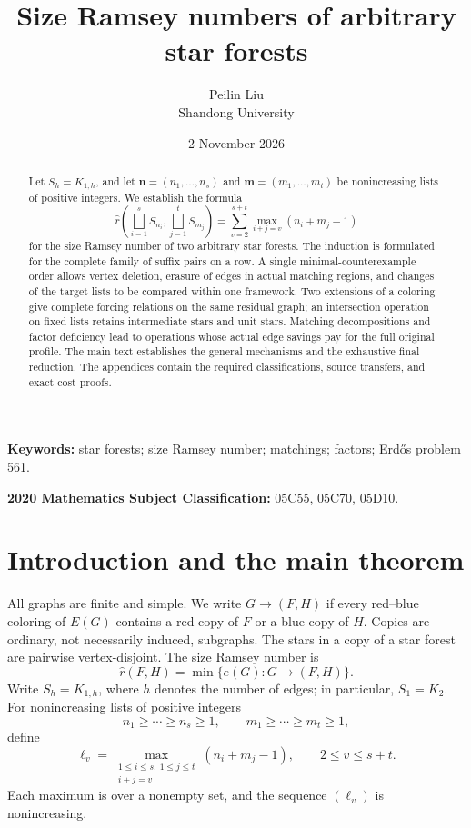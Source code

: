 \documentclass[11pt,a4paper]{article}
\title{Size Ramsey numbers of arbitrary star forests}
\author{Peilin Liu\\\small Shandong University}
\date{2 November 2026}
\newcommand{\rh}{\widehat r}
\newcommand{\nn}{\mathbf n}\newcommand{\mm}{\mathbf m}
\newcommand{\sq}{\bigsqcup}
\theoremstyle{definition}
\begin{document}
\maketitle

\begin{abstract}
Let $S_h=K_{1,h}$, and let $\nn=(n_1,\ldots,n_s)$ and $\mm=(m_1,\ldots,m_t)$ be nonincreasing lists of positive integers. We establish the formula
\[
\rh\left(\sq_{i=1}^{s}S_{n_i},\sq_{j=1}^{t}S_{m_j}\right)
=\sum_{v=2}^{s+t}\max_{i+j=v}(n_i+m_j-1)
\]
for the size Ramsey number of two arbitrary star forests. The induction is formulated for the complete family of suffix pairs on a row. A single minimal-counterexample order allows vertex deletion, erasure of edges in actual matching regions, and changes of the target lists to be compared within one framework. Two extensions of a coloring give complete forcing relations on the same residual graph; an intersection operation on fixed lists retains intermediate stars and unit stars. Matching decompositions and factor deficiency lead to operations whose actual edge savings pay for the full original profile. The main text establishes the general mechanisms and the exhaustive final reduction. The appendices contain the required classifications, source transfers, and exact cost proofs.
\end{abstract}
\noindent\textbf{Keywords:} star forests; size Ramsey number; matchings; factors; Erdős problem 561.\par
\noindent\textbf{2020 Mathematics Subject Classification:} 05C55, 05C70, 05D10.
\tableofcontents
\newpage
\section{Introduction and the main theorem}
All graphs are finite and simple. We write $G\to(F,H)$ if every red--blue coloring of $E(G)$ contains a red copy of $F$ or a blue copy of $H$. Copies are ordinary, not necessarily induced, subgraphs. The stars in a copy of a star forest are pairwise vertex-disjoint. The size Ramsey number is
\[
\rh(F,H)=\min\{e(G):G\to(F,H)\}.
\]
Write $S_h=K_{1,h}$, where $h$ denotes the number of edges; in particular, $S_1=K_2$. For nonincreasing lists of positive integers
\[
n_1\ge\cdots\ge n_s\ge1,\qquad m_1\ge\cdots\ge m_t\ge1,
\]
define
\begin{equation}\label{eq:profile}
\ell_v=\max_{\substack{1\le i\le s,\ 1\le j\le t\\i+j=v}}
(n_i+m_j-1),\qquad 2\le v\le s+t.
\end{equation}
Each maximum is over a nonempty set, and the sequence $(\ell_v)$ is nonincreasing.
\end{document}

